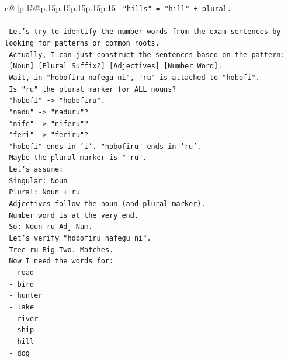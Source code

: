 \documentclass{article}
\begin{document}
{\begin{supertabular}{c@{$\;$}|p{.15\linewidth}@{}p{.15\linewidth}p{.15\linewidth}p{.15\linewidth}p{.15\linewidth}p{.15\linewidth}}
{{{\texttt{        "hills" = "hill" + plural.} \\
\\ 
\texttt{        Let's try to identify the number words from the exam sentences by looking for patterns or common roots.} \\
\texttt{        Actually, I can just construct the sentences based on the pattern:} \\
\texttt{        {[}Noun{]} {[}Plural Suffix?{]} {[}Adjectives{]} {[}Number Word{]}.} \\
\texttt{        Wait, in "hobofiru nafegu ni", "ru" is attached to "hobofi".} \\
\texttt{        Is "ru" the plural marker for ALL nouns?} \\
\texttt{        "hobofi" {-}> "hobofiru".} \\
\texttt{        "nadu" {-}> "naduru"?} \\
\texttt{        "nife" {-}> "niferu"?} \\
\texttt{        "feri" {-}> "feriru"?} \\
\texttt{        "hobofi" ends in 'i'. "hobofiru" ends in 'ru'.} \\
\texttt{        Maybe the plural marker is "{-}ru".} \\
\texttt{        Let's assume:} \\
\texttt{        Singular: Noun} \\
\texttt{        Plural: Noun + ru} \\
\texttt{        Adjectives follow the noun (and plural marker).} \\
\texttt{        Number word is at the very end.} \\
\texttt{        So: Noun{-}ru{-}Adj{-}Num.} \\
\texttt{        Let's verify "hobofiru nafegu ni".} \\
\texttt{        Tree{-}ru{-}Big{-}Two. Matches.} \\
\texttt{        Now I need the words for:} \\
\texttt{        {-} road} \\
\texttt{        {-} bird} \\
\texttt{        {-} hunter} \\
\texttt{        {-} lake} \\
\texttt{        {-} river} \\
\texttt{        {-} ship} \\
\texttt{        {-} hill} \\
\texttt{        {-} dog} \\
}}}
\end{supertabular}}
\end{document}
